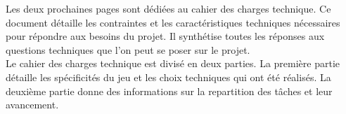 

Les deux prochaines pages sont dédiées au cahier des charges technique.
Ce document détaille les contraintes et les caractéristiques techniques nécessaires pour répondre aux besoins du projet.
Il synthétise toutes les réponses aux questions techniques que l'on peut se poser sur le projet.
\\

Le cahier des charges technique est divisé en deux parties.
La première partie détaille les spécificités du jeu et les choix techniques qui ont été réalisés. 
La deuxième partie donne des informations sur la repartition des tâches et leur avancement.




